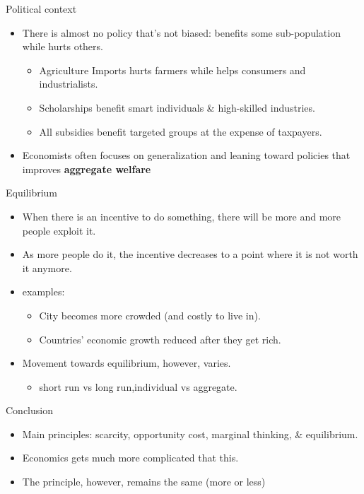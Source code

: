 \documentclass[
  ignorenonframetext,
]{beamer}
\providecommand{\tightlist}{%
  \setlength{\itemsep}{0pt}\setlength{\parskip}{0pt}}\usepackage{longtable,booktabs,array}
\begin{document}
\begin{frame}{Political context}
\protect\hypertarget{political-context}{}
\begin{itemize}
\item
  There is almost no policy that's not biased: benefits some
  sub-population while hurts others.

  \begin{itemize}
  \item
    Agriculture Imports hurts farmers while helps consumers and
    industrialists.
  \item
    Scholarships benefit smart individuals \& high-skilled industries.
  \item
    All subsidies benefit targeted groups at the expense of taxpayers.
  \end{itemize}
\item
  Economists often focuses on generalization and leaning toward policies
  that improves \textbf{aggregate welfare}
\end{itemize}
\end{frame}

\begin{frame}{Equilibrium}
\protect\hypertarget{equilibrium}{}
\begin{itemize}
\item
  When there is an incentive to do something, there will be more and
  more people exploit it.
\item
  As more people do it, the incentive decreases to a point where it is
  not worth it anymore.
\item
  examples:

  \begin{itemize}
  \item
    City becomes more crowded (and costly to live in).
  \item
    Countries' economic growth reduced after they get rich.
  \end{itemize}
\item
  Movement towards equilibrium, however, varies.

  \begin{itemize}
  \tightlist
  \item
    short run vs long run,individual vs aggregate.
  \end{itemize}
\end{itemize}
\end{frame}

\begin{frame}{Conclusion}
\protect\hypertarget{conclusion}{}
\begin{itemize}
\item
  Main principles: scarcity, opportunity cost, marginal thinking, \&
  equilibrium.
\item
  Economics gets much more complicated that this.
\item
  The principle, however, remains the same (more or less)
\end{itemize}
\end{frame}
\end{document}
